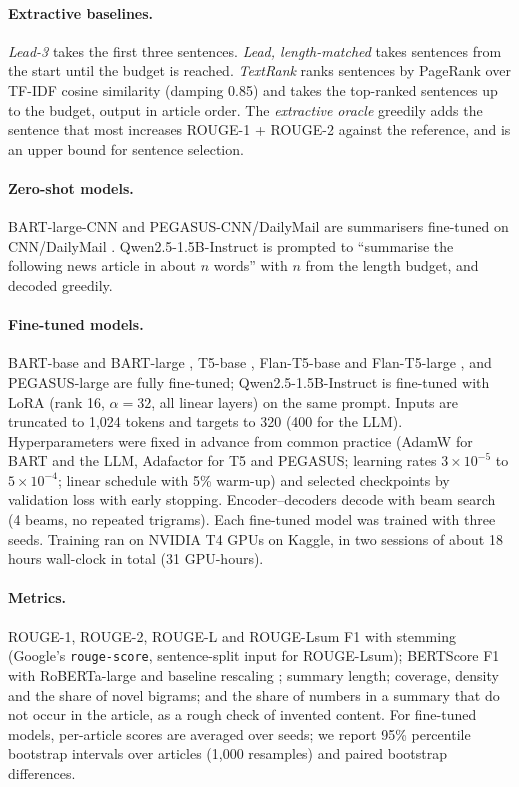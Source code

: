 \documentclass[11pt,a4paper]{article}
\begin{document}
\paragraph{Extractive baselines.} \textit{Lead-3} takes the first three sentences. \textit{Lead, length-matched} takes sentences from the start until the budget is reached. \textit{TextRank} ranks sentences by PageRank over TF-IDF cosine similarity (damping 0.85) and takes the top-ranked sentences up to the budget, output in article order. The \textit{extractive oracle} greedily adds the sentence that most increases ROUGE-1 + ROUGE-2 against the reference, and is an upper bound for sentence selection.

\paragraph{Zero-shot models.} BART-large-CNN and PEGASUS-CNN/DailyMail are summarisers fine-tuned on CNN/DailyMail \cite{lewis2020bart,zhang2020pegasus}. Qwen2.5-1.5B-Instruct \cite{qwen2025qwen25} is prompted to ``summarise the following news article in about $n$ words'' with $n$ from the length budget, and decoded greedily.

\paragraph{Fine-tuned models.} BART-base and BART-large \cite{lewis2020bart}, T5-base \cite{raffel2020t5}, Flan-T5-base and Flan-T5-large \cite{chung2024flan}, and PEGASUS-large \cite{zhang2020pegasus} are fully fine-tuned; Qwen2.5-1.5B-Instruct is fine-tuned with LoRA \cite{hu2022lora} (rank 16, $\alpha = 32$, all linear layers) on the same prompt. Inputs are truncated to 1,024 tokens and targets to 320 (400 for the LLM). Hyperparameters were fixed in advance from common practice (AdamW for BART and the LLM, Adafactor for T5 and PEGASUS; learning rates $3\times10^{-5}$ to $5\times10^{-4}$; linear schedule with 5\% warm-up) and selected checkpoints by validation loss with early stopping. Encoder--decoders decode with beam search (4 beams, no repeated trigrams). Each fine-tuned model was trained with three seeds. Training ran on NVIDIA T4 GPUs on Kaggle, in two sessions of about 18 hours wall-clock in total (31 GPU-hours).

\paragraph{Metrics.} ROUGE-1, ROUGE-2, ROUGE-L and ROUGE-Lsum F1 \cite{lin2004rouge} with stemming (Google's \texttt{rouge-score}, sentence-split input for ROUGE-Lsum); BERTScore F1 with RoBERTa-large and baseline rescaling \cite{zhang2020bertscore}; summary length; coverage, density \cite{grusky2018newsroom} and the share of novel bigrams; and the share of numbers in a summary that do not occur in the article, as a rough check of invented content. For fine-tuned models, per-article scores are averaged over seeds; we report 95\% percentile bootstrap intervals over articles (1,000 resamples) and paired bootstrap differences.
\end{document}

